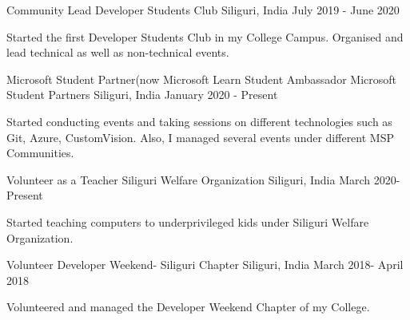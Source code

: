 \begin{cventries}
  \cventry
    {Community Lead}
    {Developer Students Club}
    {Siliguri, India}
    {July 2019 - June 2020}
    {
      \begin{cvitems}
	    \item {Started the first Developer Students Club in my College Campus. Organised and lead technical as well as non-technical events.}
      \end{cvitems}
    }
    \cventry
    {Microsoft Student Partner(now Microsoft Learn Student Ambassador}
    {Microsoft Student Partners}
    {Siliguri, India}
    {January 2020 - Present}
    {
      \begin{cvitems}
        \item {Started conducting events and taking sessions on different technologies such as Git, Azure, CustomVision. Also, I managed several events under different MSP Communities.}
      \end{cvitems}
    }
  \cventry
    {Volunteer as a Teacher}
    {Siliguri Welfare Organization}
    {Siliguri, India}
    {March 2020- Present}
    {
     \begin{cvitems}
        \item{Started teaching computers to underprivileged kids under Siliguri Welfare Organization. }
        \end{cvitems}
        }
        \cventry
        {Volunteer}
        {Developer Weekend- Siliguri Chapter}
        {Siliguri, India}
        {March 2018- April 2018}
        {
        \begin{cvitems}
        	\item{Volunteered and managed the Developer Weekend Chapter of my College.}
            \end{cvitems}
        }
        \end{cventries}
        